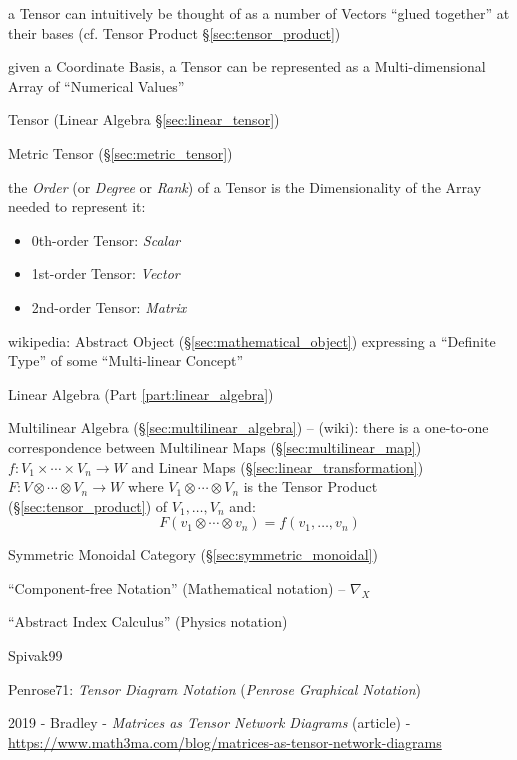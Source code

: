 {{%

a Tensor can intuitively be thought of as a number of Vectors ``glued together''
at their bases (cf. Tensor Product \S\ref{sec:tensor_product})

given a Coordinate Basis, a Tensor can be represented as a Multi-dimensional
Array of ``Numerical Values'' %

\fist Tensor (Linear Algebra \S\ref{sec:linear_tensor})

\fist Metric Tensor (\S\ref{sec:metric_tensor})

the \emph{Order} (or \emph{Degree} or \emph{Rank}) of a Tensor is the
Dimensionality of the Array needed to represent it:

\begin{itemize}
  \item 0th-order Tensor: \emph{Scalar}
  \item 1st-order Tensor: \emph{Vector}
  \item 2nd-order Tensor: \emph{Matrix}
\end{itemize}

wikipedia: Abstract Object (\S\ref{sec:mathematical_object}) expressing a
``Definite Type'' of some ``Multi-linear Concept''

Linear Algebra (Part \ref{part:linear_algebra})

Multilinear Algebra (\S\ref{sec:multilinear_algebra}) --
(wiki): there is a one-to-one correspondence between Multilinear Maps
(\S\ref{sec:multilinear_map})
$f : V_1 \times \cdots \times V_n \rightarrow W$
and Linear Maps (\S\ref{sec:linear_transformation})
$F : V \otimes \cdots \otimes V_n \rightarrow W$
where $V_1 \otimes \cdots \otimes V_n$ is the Tensor Product
(\S\ref{sec:tensor_product}) of $V_1, \ldots, V_n$ and:
\[
  F(v_1 \otimes \cdots \otimes v_n) = f(v_1, \ldots, v_n)
\]

Symmetric Monoidal Category (\S\ref{sec:symmetric_monoidal})

\asterism

``Component-free Notation'' (Mathematical notation) -- $\nabla_X$

``Abstract Index Calculus'' (Physics notation)

Spivak99

Penrose71: \emph{Tensor Diagram Notation} (\emph{Penrose Graphical Notation})

2019 - Bradley - \emph{Matrices as Tensor Network Diagrams} (article) -
\url{https://www.math3ma.com/blog/matrices-as-tensor-network-diagrams}



}}
